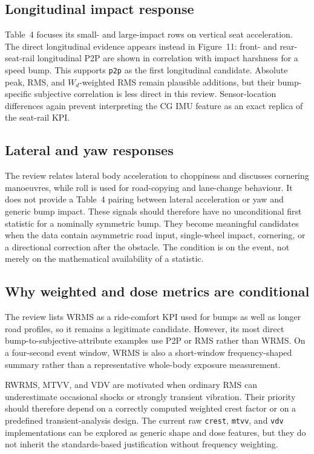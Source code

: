 \documentclass[letterpaper,journal]{IEEEtran}
\begin{document}
\subsection{Longitudinal impact response}

Table~4 focuses its small- and large-impact rows on vertical seat acceleration. The direct
longitudinal evidence appears instead in Figure~11: front- and rear-seat-rail longitudinal P2P
are shown in correlation with impact harshness for a speed bump. This supports
\texttt{p2p} as the first longitudinal candidate. Absolute peak, RMS, and $W_d$-weighted RMS
remain plausible additions, but their bump-specific subjective correlation is less direct in this
review. Sensor-location differences again prevent interpreting the CG IMU feature as an exact
replica of the seat-rail KPI.

\subsection{Lateral and yaw responses}

The review relates lateral body acceleration to choppiness and discusses cornering manoeuvres,
while roll is used for road-copying and lane-change behaviour. It does not provide a Table~4
pairing between lateral acceleration or yaw and generic bump impact. These signals should
therefore have no unconditional first statistic for a nominally symmetric bump. They become
meaningful candidates when the data contain asymmetric road input, single-wheel impact,
cornering, or a directional correction after the obstacle. The condition is on the event, not
merely on the mathematical availability of a statistic.

\subsection{Why weighted and dose metrics are conditional}

The review lists WRMS as a ride-comfort KPI used for bumps as well as longer road profiles,
so it remains a legitimate candidate. However, its most direct bump-to-subjective-attribute
examples use P2P or RMS rather than WRMS. On a four-second event window, WRMS is also a
short-window frequency-shaped summary rather than a representative whole-body exposure
measurement.

RWRMS, MTVV, and VDV are motivated when ordinary RMS can underestimate occasional shocks
or strongly transient vibration. Their priority should therefore depend on a correctly computed
weighted crest factor or on a predefined transient-analysis design. The current raw
\texttt{crest}, \texttt{mtvv}, and \texttt{vdv} implementations can be explored as generic
shape and dose features, but they do not inherit the standards-based justification without
frequency weighting.
\end{document}
